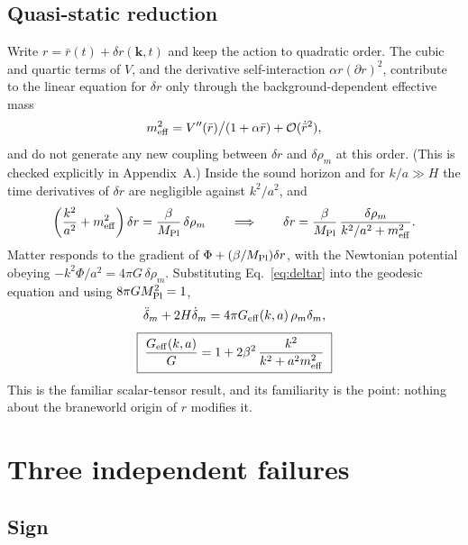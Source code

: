 \documentclass[11pt,a4paper]{article}
\newcommand{\Mpl}{M_{\rm Pl}}
\newcommand{\Geff}{G_{\rm eff}}
\newcommand{\meff}{m_{\rm eff}}
\begin{document}
\subsection{Quasi-static reduction}

Write $r=\bar r(t)+\delta r(\mathbf{k},t)$ and keep the action to quadratic order.
The cubic and quartic terms of $V$, and the derivative self-interaction
$\alpha r(\partial r)^2$, contribute to the linear equation for $\delta r$ only
through the background-dependent effective mass
\begin{equation}
\meff^2 = V''(\bar r)\big/\!\left(1+\alpha\bar r\right) + \mathcal{O}(\dot{\bar r}^2),
\end{equation}
and do not generate any new coupling between $\delta r$ and $\delta\rho_m$ at this
order. (This is checked explicitly in Appendix~A.) Inside the sound horizon and for
$k/a\gg H$ the time derivatives of $\delta r$ are negligible against $k^2/a^2$, and
\begin{equation}
\left(\frac{k^2}{a^2}+\meff^2\right)\delta r
=\frac{\beta}{\Mpl}\,\delta\rho_m
\qquad\Longrightarrow\qquad
\delta r=\frac{\beta}{\Mpl}\,
\frac{\delta\rho_m}{k^2/a^2+\meff^2}.
\label{eq:deltar}
\end{equation}
Matter responds to the gradient of $\Phi+(\beta/\Mpl)\delta r$, with the Newtonian
potential obeying $-k^2\Phi/a^2=4\pi G\,\delta\rho_m$. Substituting
Eq.~\eqref{eq:deltar} into the geodesic equation and using $8\pi G\Mpl^2=1$,
\begin{equation}
\ddot\delta_m+2H\dot\delta_m=4\pi G_{\rm eff}(k,a)\,\rho_m\delta_m,
\end{equation}
\begin{equation}
\boxed{\;
\frac{\Geff(k,a)}{G}=1+2\beta^2\,\frac{k^2}{k^2+a^2\meff^2}\;}
\label{eq:geff}
\end{equation}
This is the familiar scalar-tensor result, and its familiarity is the point: nothing
about the braneworld origin of $r$ modifies it.

\section{Three independent failures}\label{sec:failures}

\subsection{Sign}
\end{document}
